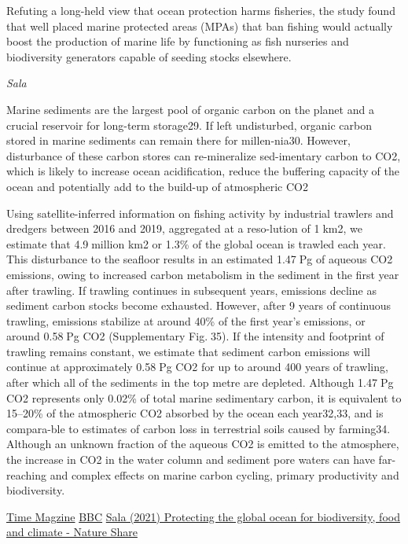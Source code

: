 \documentclass[
]{book}
\begin{document}
Refuting a long-held view that ocean protection harms fisheries, the study found that well placed marine protected areas (MPAs) that ban fishing would actually boost the production of marine life by functioning as fish nurseries and biodiversity generators capable of seeding stocks elsewhere.

\emph{Sala}

Marine sediments are the largest pool of organic carbon on the planet and a crucial reservoir for long-term storage29. If left undisturbed, organic carbon stored in marine sediments can remain there for millen-nia30. However, disturbance of these carbon stores can re-mineralize sed-imentary carbon to CO2, which is likely to increase ocean acidification, reduce the buffering capacityof the ocean and potentially add to the build-up of atmospheric CO2

Using satellite-inferred information on fishing activity by industrial trawlers and dredgers between 2016 and 2019, aggregated at a reso-lution of 1km2, we estimate that 4.9million km2 or 1.3\% of the global ocean is trawled each year. This disturbance to the seafloor results in an estimated 1.47Pg of aqueous CO2 emissions, owing to increased carbon metabolism in the sediment in the first year after trawling. If trawling continues in subsequent years, emissions decline as sediment
carbon stocks become exhausted. However, after 9 years of continuous trawling, emissions stabilize at around 40\% of the first year's emissions, or around 0.58Pg CO2 (Supplementary Fig.35). If the intensity and footprint of trawling remains constant, we estimate that sediment carbon emissions will continue at approximately 0.58Pg CO2 for up to around 400 years of trawling, after which all of the sediments in the top metre are depleted. Although 1.47Pg CO2 represents only 0.02\% of total marine sedimentary carbon, it is equivalent to 15--20\% of the atmospheric CO2 absorbed by the ocean each year32,33, and is compara-ble to estimates of carbon loss in terrestrial soils caused by farming34. Although an unknown fraction of the aqueous CO2 is emitted to the atmosphere, the increase in CO2 in the water column and sediment pore waters can have far-reaching and complex effects on marine carbon cycling, primary productivity and biodiversity.

\href{https://time.com/5947430/bottom-trawling-carbon-emissions-study/}{Time Magzine}
\href{https://www.bbc.com/news/science-environment-56430542}{BBC}
\href{https://www.nature.com/articles/s41586-021-03371-z.epdf?sharing_token=6Sow3BIdqBYvlWAiGEDpk9RgN0jAjWel9jnR3ZoTv0MwjSp_dqdYRo11ccDn9dqPW5D1xJuK8fpT__q4KFNUwr3chDwJyG9IO5W1aWFy5onfZKtxUPkvQTnzNtoVopyg-N66E6j3SdEzqNh2UnnVHpANtYD9CYy7I3QNIz6iI184RD1jaDt2fU8Yl8bdsQppKG7J6tfBiSTN74eTrygUTMPeqTv4M1289Ys38rtf2Cu5Gfo8iuQxzcCwuSri_N3NIdmY-iR2Af8IOP_F9-p_RA\%3D\%3D\&tracking_referrer=time.com}{Sala (2021) Protecting the global ocean for biodiversity, food and climate - Nature Share}
\end{document}

